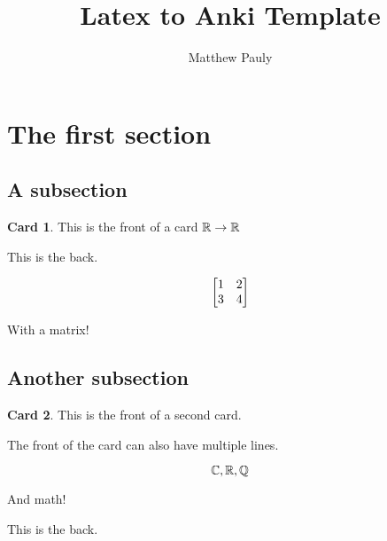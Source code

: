 \documentclass[11pt, oneside]{article}
\theoremstyle{definition}
\newtheorem{card}{Card}
\begin{document}
    \title{Latex to Anki Template}
    \author{Matthew Pauly}
    \date{}
    \maketitle
    
    \tableofcontents
    \newpage

    \section{The first section}

    \subsection{A subsection}

    \begin{card}
        This is the front of a card $\mathbb R\to\mathbb R$
        
        \medskip %

        This is the back.

        $$ \left[\begin{matrix}1 & 2 \\ 3 & 4\end{matrix}\right] $$

        With a matrix!
    \end{card}

    \subsection{Another subsection}

    \begin{card}
        This is the front of a second card.
        
        The front of the card can also have multiple lines.

        \[
            \mathbb C,
            \mathbb R,
            \mathbb Q
        \]

        And math!

        \medskip %

        This is the back.

    \end{card}
\end{document}
